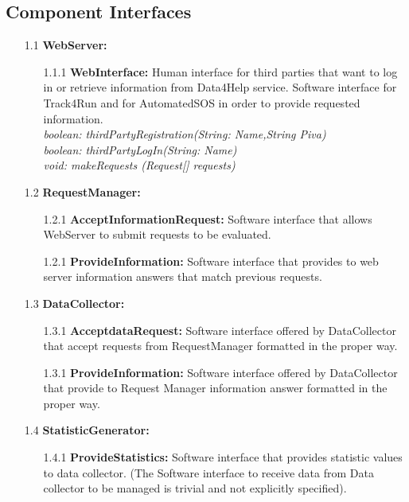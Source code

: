 \subsection{Component Interfaces}

\begin{enumerate}

\item[1.1] \textbf{WebServer: }
	\begin{enumerate}
		\item[1.1.1] \textbf{WebInterface:} Human interface for third parties that want to log in or retrieve information from Data4Help service. Software interface for Track4Run and for AutomatedSOS in order to provide requested information.
		\\\textit{ boolean: thirdPartyRegistration(String: Name,String Piva)
				\\ boolean: thirdPartyLogIn(String: Name)
				\\ void: makeRequests (Request[] requests)
				 }
	\end{enumerate}
	
\item[1.2] \textbf{RequestManager: }
	\begin{enumerate}
		\item[1.2.1] \textbf{AcceptInformationRequest:} Software interface that allows WebServer to submit requests to be evaluated.
		\item[1.2.1] \textbf{ProvideInformation:} Software interface that provides to web server information answers that match previous requests.
	\end{enumerate}

\item[1.3] \textbf{DataCollector: }
	\begin{enumerate}
		\item[1.3.1] \textbf{AcceptdataRequest:} Software interface offered by DataCollector that accept requests from RequestManager formatted in the proper way.
		\item[1.3.1] \textbf{ProvideInformation:} Software interface offered by DataCollector that provide to Request Manager information answer formatted in the proper way.
	\end{enumerate}
	
\item[1.4] \textbf{StatisticGenerator: }
	\begin{enumerate}
		\item[1.4.1] \textbf{ProvideStatistics:} Software interface that provides statistic values to data collector. (The Software interface to receive data from Data collector to be managed is trivial and not explicitly specified).
	\end{enumerate}
	

\end{enumerate}
